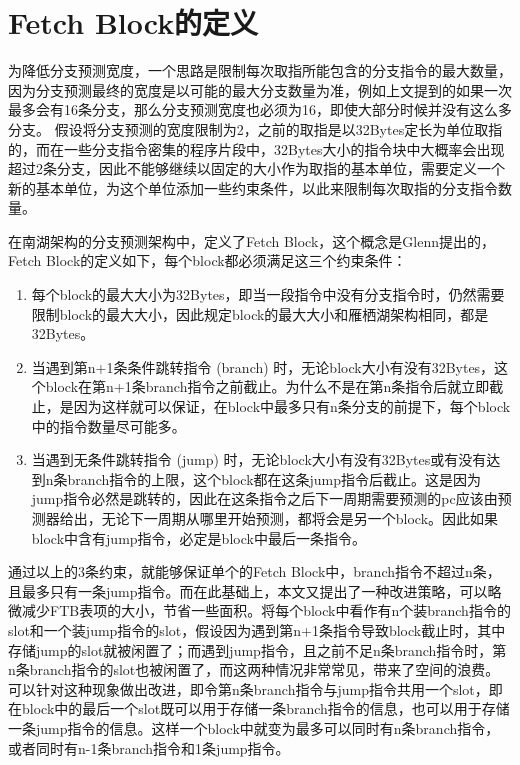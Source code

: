 \section{Fetch Block的定义}

为降低分支预测宽度，一个思路是限制每次取指所能包含的分支指令的最大数量，因为分支预测最终的宽度是以可能的最大分支数量为准，例如上文提到的如果一次最多会有16条分支，那么分支预测宽度也必须为16，即使大部分时候并没有这么多分支。
假设将分支预测的宽度限制为2，之前的取指是以32Bytes定长为单位取指的，而在一些分支指令密集的程序片段中，32Bytes大小的指令块中大概率会出现超过2条分支，因此不能够继续以固定的大小作为取指的基本单位，需要定义一个新的基本单位，为这个单位添加一些约束条件，以此来限制每次取指的分支指令数量。

在南湖架构的分支预测架构中，定义了Fetch Block，这个概念是Glenn\cite{scalable-frontend}提出的，Fetch Block的定义如下，每个block都必须满足这三个约束条件：

\begin{enumerate}
    \item 每个block的最大大小为32Bytes，即当一段指令中没有分支指令时，仍然需要限制block的最大大小，因此规定block的最大大小和雁栖湖架构相同，都是32Bytes。
    \item 当遇到第n+1条条件跳转指令 (branch) 时，无论block大小有没有32Bytes，这个block在第n+1条branch指令之前截止。为什么不是在第n条指令后就立即截止，是因为这样就可以保证，在block中最多只有n条分支的前提下，每个block中的指令数量尽可能多。
    \item 当遇到无条件跳转指令 (jump) 时，无论block大小有没有32Bytes或有没有达到n条branch指令的上限，这个block都在这条jump指令后截止。这是因为jump指令必然是跳转的，因此在这条指令之后下一周期需要预测的pc应该由预测器给出，无论下一周期从哪里开始预测，都将会是另一个block。因此如果block中含有jump指令，必定是block中最后一条指令。
\end{enumerate}

通过以上的3条约束，就能够保证单个的Fetch Block中，branch指令不超过n条，且最多只有一条jump指令。而在此基础上，本文又提出了一种改进策略，可以略微减少FTB表项的大小，节省一些面积。将每个block中看作有n个装branch指令的slot和一个装jump指令的slot，假设因为遇到第n+1条指令导致block截止时，其中存储jump的slot就被闲置了；而遇到jump指令，且之前不足n条branch指令时，第n条branch指令的slot也被闲置了，而这两种情况非常常见，带来了空间的浪费。可以针对这种现象做出改进，即令第n条branch指令与jump指令共用一个slot，即在block中的最后一个slot既可以用于存储一条branch指令的信息，也可以用于存储一条jump指令的信息。这样一个block中就变为最多可以同时有n条branch指令，或者同时有n-1条branch指令和1条jump指令。

